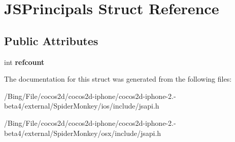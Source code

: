 \hypertarget{struct_j_s_principals}{\section{J\-S\-Principals Struct Reference}
\label{struct_j_s_principals}
}
\subsection*{Public Attributes}
\begin{DoxyCompactItemize}
\item 
\hypertarget{struct_j_s_principals_aa2411d4db9a77314f5cfafc9e3b2fe27}{int {\bfseries refcount}}\label{struct_j_s_principals_aa2411d4db9a77314f5cfafc9e3b2fe27}

\end{DoxyCompactItemize}


The documentation for this struct was generated from the following files\-:\begin{DoxyCompactItemize}
\item 
/\-Bing/\-File/cocos2d/cocos2d-\/iphone/cocos2d-\/iphone-\/2.-\/beta4/external/\-Spider\-Monkey/ios/include/jsapi.\-h\item 
/\-Bing/\-File/cocos2d/cocos2d-\/iphone/cocos2d-\/iphone-\/2.-\/beta4/external/\-Spider\-Monkey/osx/include/jsapi.\-h\end{DoxyCompactItemize}
